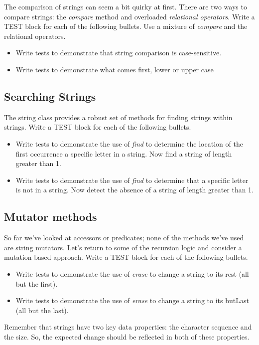 \documentclass[]{tufte-handout}
\begin{document}
The comparison of strings can seem a bit quirky at first. There are two ways to compare strings: the \textit{compare} method and overloaded \textit{relational operators}\sidenote{== , !=, <=,>=,<,>}.  Write a TEST block for each of the following bullets. Use a mixture of \textit{compare} and the relational operators.
\begin{itemize}
\item Write tests to demonstrate that string comparison is case-sensitive. 
\item Write tests to demonstrate what comes first, lower or upper case
\end{itemize}

\subsection{Searching Strings}

The string class provides a robust set of methods for finding strings within strings.  Write a TEST block for each of the following bullets.
\begin{itemize}
\item Write tests to demonstrate the use of \textit{find} to determine the location of the first occurrence a specific letter in a string. Now find a string of length greater than 1.
\item Write tests to demonstrate the use of \textit{find} to determine that a specific letter is not in a string. Now detect the absence of a string of length greater than 1.
\end{itemize}

\subsection{Mutator methods}

So far we've looked at accessors or predicates; none of the methods we've used are string mutators. Let's return to some of the recursion logic and consider a mutation based approach. Write a TEST block for each of the following bullets.
\begin{itemize}
\item Write tests to demonstrate the use of \textit{erase} to change a string to its rest (all but the first).
\item Write tests to demonstrate the use of \textit{erase} to change a string to its butLast (all but the last).
\end{itemize}
Remember that strings have two key data properties: the character sequence and the size.  So, the expected change should be reflected in both of these properties. 
\end{document}
